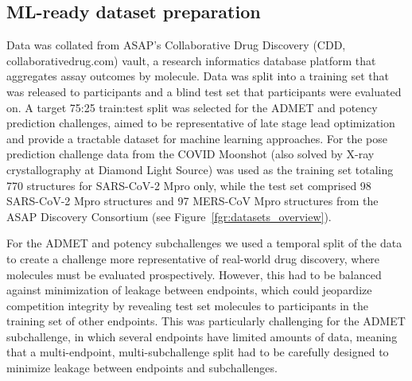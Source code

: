 \documentclass[journal=jcim,manuscript=article]{achemso}
\begin{document}
\subsection{ML-ready dataset preparation}

Data was collated from ASAP’s Collaborative Drug Discovery (CDD, collaborativedrug.com) vault, a research informatics database platform that aggregates assay outcomes by molecule. Data was split into a training set that was released to participants and a blind test set that participants were evaluated on. A target 75:25 train:test split was selected for the ADMET and potency prediction challenges, aimed to be representative of late stage lead optimization and provide a tractable dataset for machine learning approaches. For the pose prediction challenge data from the COVID Moonshot\cite{boby_2023} (also solved by X-ray crystallography at Diamond Light Source) was used as the training set totaling 770 structures for SARS-CoV-2 Mpro only, while the test set comprised 98 SARS-CoV-2 Mpro structures and 97 MERS-CoV Mpro structures from the ASAP Discovery Consortium (see Figure~\ref{fgr:datasets_overview}).  

For the ADMET and potency subchallenges we used a temporal split of the data to create a challenge more representative of real-world drug discovery, where molecules must be evaluated prospectively\cite{sheridan_time-split_2013}. However, this had to be balanced against minimization of leakage between endpoints, which could jeopardize competition integrity by revealing test set molecules to participants in the training set of other endpoints. This was particularly challenging for the ADMET subchallenge, in which several endpoints have limited amounts of data, meaning that a multi-endpoint, multi-subchallenge split had to be carefully designed to minimize leakage between endpoints and subchallenges. 
\end{document}
